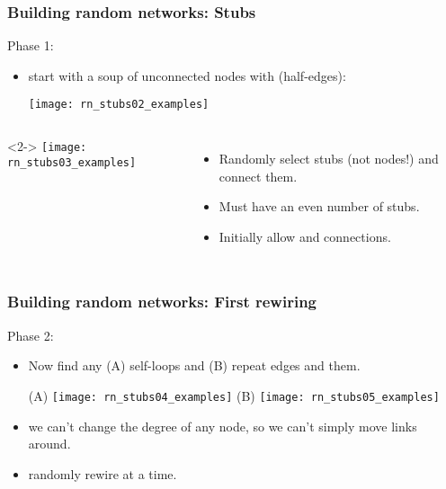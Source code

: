 \begin{frame}[label=]
  \frametitle{Building random networks: Stubs}

  \begin{block}{Phase 1:}
    \begin{itemize}
    \item<1->  start with a soup of unconnected nodes
      with  (half-edges):
      \begin{center}
        \texttt{[image: rn\_stubs02\_examples]}
      \end{center}
    \end{itemize}
    \begin{columns}<2->
      \texttt{[image: rn\_stubs03\_examples]}
      \begin{itemize}
      \item<3-> Randomly select stubs (not nodes!) and connect them.
      \item<4-> Must have an even number of stubs.
      \item<5-> Initially allow  and  connections.
      \end{itemize}
    \end{columns}

  \end{block}

\end{frame}



\begin{frame}[label=]
  \frametitle{Building random networks: First rewiring}

  \begin{block}{Phase 2:}
    \begin{itemize}
    \item<1-> Now find any (A) self-loops and (B) repeat edges 
      and  them.
      \begin{center}
        (A)
        \texttt{[image: rn\_stubs04\_examples]}
        \qquad
        (B)
        \texttt{[image: rn\_stubs05\_examples]}
      \end{center}
    \item<2->  we can't change
      the degree of any node, so we can't simply move
      links around.
    \item<3->  
      randomly rewire  at a time.
    \end{itemize}
  \end{block}

\end{frame}

